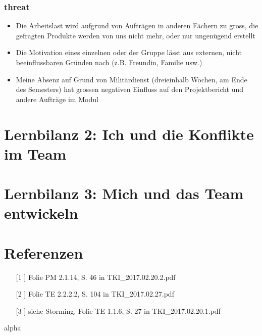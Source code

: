 \documentclass[11pt,twoside]{hsrthesis}
\begin{document}
\subsection{threat}
\begin{itemize}
\item Die Arbeitslast wird aufgrund von Aufträgen in anderen Fächern zu gross, die gefragten Produkte werden von uns nicht mehr, oder nur ungenügend erstellt
\item Die Motivation eines einzelnen oder der Gruppe lässt aus externen, nicht beeinflussbaren Gründen nach (z.B. Freundin, Familie usw.)
\item Meine Absenz auf Grund von Militärdienst (dreieinhalb Wochen, am Ende des Semesters) hat grossen negativen Einfluss auf den Projektbericht und andere Aufträge im Modul
\end{itemize}

\chapter{Lernbilanz 2: Ich und die Konflikte im Team}

\chapter{Lernbilanz 3: Mich und das Team entwickeln} 

\chapter{Referenzen}

\begin{itemize}
\item[[1]] Folie PM	2.1.14, S. 46 in TKI{\_}2017.02.20.2.pdf
\item[[2]] Folie TE 2.2.2.2, S. 104 in TKI{\_}2017.02.27.pdf
\item[[3]] siehe Storming, Folie TE 1.1.6, S. 27 in TKI{\_}2017.02.20.1.pdf
\end{itemize}
 

 {alpha}



 
\end{document}

